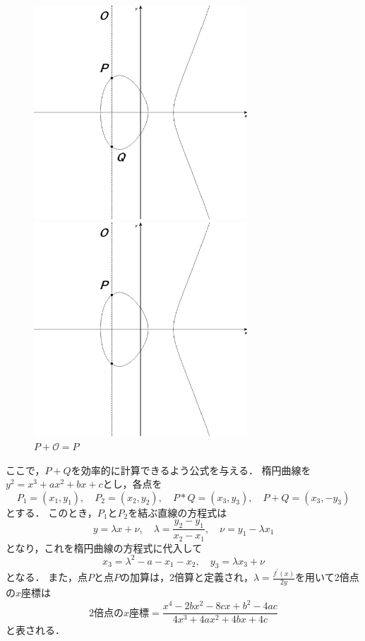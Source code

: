\begin{figure}[htbp]
  \begin{minipage}{0.5\hsize}
    \begin{center}
      \includegraphics[width=80mm]{elliptic03.eps}
    \end{center}
    \caption{$P+Q=\mathcal{O}$}    \label{fig:elliptic03.eps}
  \end{minipage}
  \begin{minipage}{0.5\hsize}
    \begin{center}
      \includegraphics[width=80mm]{elliptic04.eps}
    \end{center}
    \caption{$P+\mathcal{O}=P$}
    \label{fig:elliptic04.eps}
  \end{minipage}
\end{figure}
\par
ここで，$P+Q$を効率的に計算できるよう公式を与える．
楕円曲線を$y^2 = x^3 + ax ^2 + bx +c$とし，各点を
\[
P _1 = (x _1, y _1), \quad P _2 = (x _2, y _2), \quad P*Q = (x _3, y _3), \quad P+Q = (x _3, - y _3)
\]
とする．
このとき，$P _1$と$P _2$を結ぶ直線の方程式は
\[
y = \lambda x + \nu, \quad \lambda = \frac{y _2 - y _1}{x _2 - x _1}, \quad \nu = y _1 - \lambda x _1
\]
となり，これを楕円曲線の方程式に代入して
\[
x _3 = \lambda ^2 - a - x _1 - x _2, \quad y _3 = \lambda x _3 + \nu
\]
となる．
また，点$P$と点$P$の加算は，2倍算と定義され，$\lambda = \frac{f^{'}(x)}{2y}$を用いて2倍点の$x$座標は
\[
2倍点のx座標 = \frac{x^4 - 2bx^2 - 8cx + b^2 - 4ac}{4x^3 + 4ax^2 + 4bx + 4c}
\]
と表される．\\
\par
